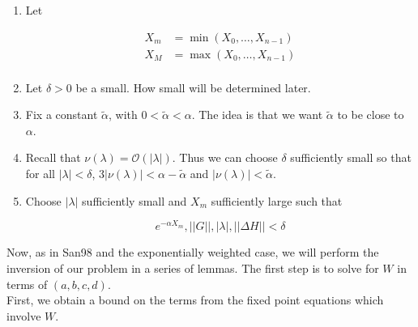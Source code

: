\documentclass[12pt]{article}
\begin{document}
\begin{enumerate}

	\item Let

	\begin{align*}
	X_m &= \min(X_0, \dots, X_{n-1}) \\
	X_M &= \max(X_0, \dots, X_{n-1}) \\
	\end{align*}

	\item Let $\delta > 0$ be a small. How small will be determined later.

	\item Fix a constant $\tilde{\alpha}$, with $0 < \tilde{\alpha} < \alpha$. The idea is that we want $\tilde{\alpha}$ to be close to $\alpha$.

	\item Recall that $\nu(\lambda) = \mathcal{O}(|\lambda|)$. Thus we can choose $\delta$ sufficiently small so that for all $|\lambda| < \delta$, $3|\nu(\lambda)| < \alpha - \tilde{\alpha}$ and $|\nu(\lambda)| < \tilde{\alpha}$.

	\item Choose $|\lambda|$ sufficiently small and $X_m$ sufficiently large such that

	\begin{equation}
	e^{-\alpha X_m}, ||G||, |\lambda|, ||\Delta H|| < \delta
	\end{equation}

\end{enumerate}


Now, as in San98 and the exponentially weighted case, we will perform the inversion of our problem in a series of lemmas. The first step is to solve for $W$ in terms of $(a, b, c, d)$.\\

First, we obtain a bound on the terms from the fixed point equations which involve $W$. 

\end{document}
